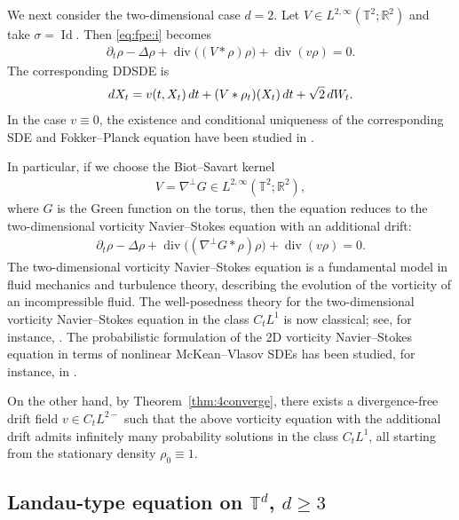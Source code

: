 \documentclass[10pt,a4paper]{amsart}
\numberwithin{equation}{section}
\def\dif{{\mathord{{\rm d}}}}
\def\geq{\geqslant}
\def\dif{{\mathord{{\rm d}}}}
\def\geq{\geqslant}
\begin{document}
We next consider the two-dimensional case $d=2$. Let
$V\in L^{2,\infty}(\mathbb{T}^2;\mathbb{R}^2)$ and take
$\sigma=\operatorname{Id}$. Then \eqref{eq:fpe:i} becomes
\begin{align*}
\partial_t\rho
-
\Delta\rho
+
\operatorname{div}\bigl((V*\rho)\rho\bigr)
+
\operatorname{div}(v\rho)
=
0 .
\end{align*}
The corresponding DDSDE is
\begin{align*}
\dif X_t
=
v(t,X_t)\,\dif t
+
(V*\rho_t)(X_t)\,\dif t
+
\sqrt{2}\,\dif W_t .
\end{align*}
In the case $v\equiv0$, the existence and conditional uniqueness of the
corresponding SDE and Fokker--Planck equation have been studied in
\cite{Kry20,Kry20b,RZZ25}.

In particular, if we choose the Biot--Savart kernel
\begin{align*}
V=\nabla^\perp G\in L^{2,\infty}(\mathbb{T}^2;\mathbb{R}^2),
\end{align*}
where  $G$ is the Green function on the torus, then the equation reduces to the
two-dimensional vorticity Navier--Stokes equation with an additional drift:
\begin{align*}
\partial_t\rho
-
\Delta\rho
+
\operatorname{div}\bigl((\nabla^\perp G*\rho)\rho\bigr)
+
\operatorname{div}(v\rho)
=
0 .
\end{align*} 
The two-dimensional vorticity Navier--Stokes equation is a fundamental model in
fluid mechanics and turbulence theory, describing the evolution of the
vorticity of an incompressible fluid. The well-posedness theory for the
two-dimensional vorticity Navier--Stokes equation in the class $C_tL^1$ is now
classical; see, for instance, \cite{MB03,BA94,GG05}.  The probabilistic formulation of the 2D vorticity
Navier--Stokes equation in terms of nonlinear McKean--Vlasov SDEs has been
studied, for instance, in \cite{BRZ25, RZZ25}.

On the other hand, by Theorem~\ref{thm:4converge}, there exists a
divergence-free drift field
$
v\in C_tL^{2-}
$
such that the above vorticity equation with the additional drift admits
infinitely many probability solutions in the class $C_tL^1$, all starting from
the stationary density $\rho_0\equiv1$.
 
 
  \subsection{Landau-type equation on $\mathbb{T}^d$, $d\geq 3$}
\label{sec:example:landau}
\end{document}
